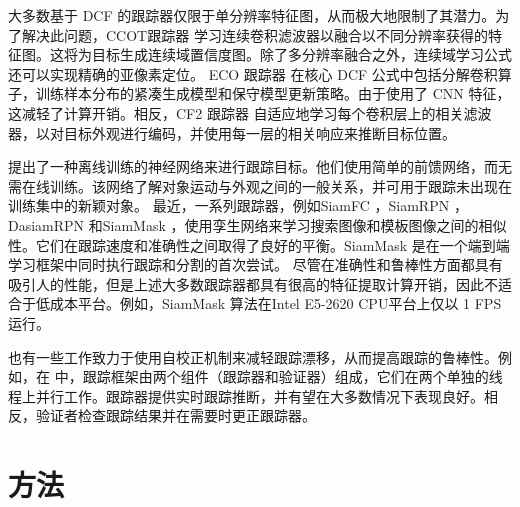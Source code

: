 大多数基于 DCF 的跟踪器仅限于单分辨率特征图，从而极大地限制了其潜力。为了解决此问题，CCOT跟踪器 \cite{CCOT} 学习连续卷积滤波器以融合以不同分辨率获得的特征图。这将为目标生成连续域置信度图。除了多分辨率融合之外，连续域学习公式还可以实现精确的亚像素定位。
ECO 跟踪器 \cite{Danelljan2017ECOEC} 在核心 DCF 公式中包括分解卷积算子，训练样本分布的紧凑生成模型和保守模型更新策略。由于使用了 CNN 特征，这减轻了计算开销。相反，CF2 跟踪器 \cite{Ma2015HierarchicalCF} 自适应地学习每个卷积层上的相关滤波器，以对目标外观进行编码，并使用每一层的相关响应来推断目标位置。

\cite{GOTURN} 提出了一种离线训练的神经网络来进行跟踪目标。他们使用简单的前馈网络，而无需在线训练。该网络了解对象运动与外观之间的一般关系，并可用于跟踪未出现在训练集中的新颖对象。
最近，一系列跟踪器，例如SiamFC \cite{SiamFC}，SiamRPN \cite{SiamRPN}，DasiamRPN \cite{zhu2018distractor} 和SiamMask \cite{Wang2018SiamMask}，使用孪生网络来学习搜索图像和模板图像之间的相似性。它们在跟踪速度和准确性之间取得了良好的平衡。SiamMask 是在一个端到端学习框架中同时执行跟踪和分割的首次尝试。
尽管在准确性和鲁棒性方面都具有吸引人的性能，但是上述大多数跟踪器都具有很高的特征提取计算开销，因此不适合于低成本平台。例如，SiamMask 算法在Intel E5-2620 CPU平台上仅以 1 FPS 运行。

也有一些工作致力于使用自校正机制来减轻跟踪漂移，从而提高跟踪的鲁棒性。例如，在 \cite{fan2018parallel} 中，跟踪框架由两个组件（跟踪器和验证器）组成，它们在两个单独的线程上并行工作。跟踪器提供实时跟踪推断，并有望在大多数情况下表现良好。相反，验证者检查跟踪结果并在需要时更正跟踪器。

\section{方法}


